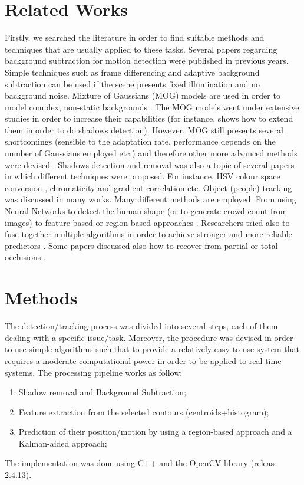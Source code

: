 \documentclass[runningheads]{llncs}
\begin{document}
\section{Related Works}
Firstly, we searched the literature in order to find suitable methods and techniques that are usually applied to these tasks.
Several papers regarding background subtraction for motion detection were published in previous years. Simple techniques such as frame differencing and adaptive background subtraction can be used if the scene presents fixed illumination and no background noise. Mixture of Gaussians (MOG) models are used in order to model complex, non-static backgrounds \cite{mog}. The MOG models went under extensive studies in order to increase their capabilities (for instance, \cite{mog_improved} shows how to extend them in order to do shadows detection). However, MOG still presents several shortcomings (sensible to the adaptation rate, performance depends on the number of Gaussians employed etc.) and therefore other more advanced methods were devised \cite{bg_codebook, bg_fuzzy, van2014vibe}. Shadows detection and removal was also a topic of several papers in which different techniques were proposed. For instance, HSV colour space conversion \cite{cucchiara2001detecting}, chromaticity and gradient correlation \cite{sanin2010detecting} etc.  
Object (people) tracking was discussed in many works. Many different methods are employed. From using Neural Networks to detect the human shape (or to generate crowd count from images)\cite{tang2017multiple, zhang2016single} to feature-based or region-based approaches \cite{5597093}. Researchers tried also to fuse together multiple algorithms in order to achieve stronger and more reliable predictors \cite{10.1007/3-540-47979-1_25}. Some papers discussed also how to recover from partial or total occlusions \cite{LERDSUDWICHAI20051059}.

\section{Methods}

The detection/tracking process was divided into several steps, each of them dealing with a specific issue/task. Moreover, the procedure was devised in order to use simple algorithms such that to provide a relatively easy-to-use system that requires a moderate computational power in order to be applied to real-time systems. The processing pipeline works as follow:
\begin{enumerate}
\item Shadow removal and Background Subtraction;
\item Feature extraction from the selected contours (centroids+histogram);
\item Prediction of their position/motion by using a region-based approach and a Kalman-aided approach;
\end{enumerate}
The implementation was done using C++ and the OpenCV library (release 2.4.13).
\end{document}
